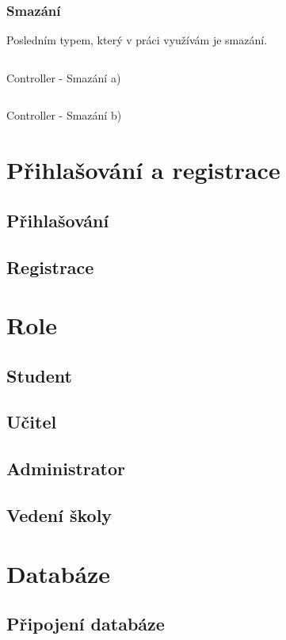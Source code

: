 \documentclass[a4paper, 12pt]{report}
\begin{document}
	\subsection{Smazání}
	Posledním typem, který v práci využívám je smazání.
	\begin{listing}[H]
	\inputminted{csharp}{SourceCode/Controllers/Delete.cs}
	\caption{Controller - Smazání a)}
	\label{Delete}
	\end{listing}
	\begin{listing}[H]
	\inputminted{csharp}{SourceCode/Controllers/Delete_Post.cs}
	\caption{Controller - Smazání b)}
	\label{Delete_Post}
	\end{listing}
	
	
	\chapter{Přihlašování a registrace}
	\section{Přihlašování}
	\section{Registrace}

	\chapter{Role} \label{Role}
	\section{Student}
	\section{Učitel}
	\section{Administrator}
	\section{Vedení školy}

	\chapter{Databáze} \label{Databaze}
	\section{Připojení databáze}
\end{document}
